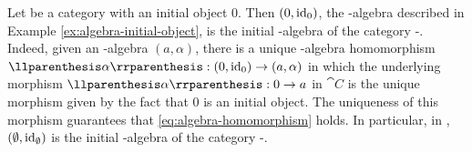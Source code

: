 \begin{example}
  \label{ex:initial-algebra-initial-object}


  Let  be a category with an initial object $0$. Then
  $(0,\operatorname{id}_{0})$, the -algebra described in Example
  \ref{ex:algebra-initial-object}, is the initial -algebra of
  the category -\alg. Indeed, given an -algebra
  $(a,\alpha)$, there is a unique -algebra homomorphism
  $\cata{\alpha}: (0,\idO{0}) \to (a,\alpha)$ in which the underlying
  morphism $\cata{\alpha}: 0 \to a$ in $\cat{C}$ is the unique
  morphism given by the fact that $0$ is an initial object. The
  uniqueness of this morphism guarantees that
  \eqref{eq:algebra-homomorphism} holds. In particular, in \set,
  $(\emptyset,\operatorname{id}_{\emptyset})$ is the initial -algebra of the
  category -\alg.

\end{example}

